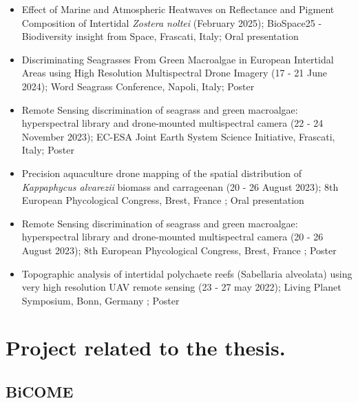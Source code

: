 \documentclass[
  letterpaper,
  11pt,
  english,
  singlespacing,
  headsepline]{MastersDoctoralThesis}
\begin{document}

\begin{itemize}
\item
  Effect of Marine and Atmospheric Heatwaves on Reflectance and Pigment
  Composition of Intertidal \emph{Zostera noltei} (February 2025);
  BioSpace25 - Biodiversity insight from Space, Frascati, Italy; Oral
  presentation
\item
  Discriminating Seagrasses From Green Macroalgae in European Intertidal
  Areas using High Resolution Multispectral Drone Imagery (17 - 21 June
  2024); Word Seagrass Conference, Napoli, Italy; Poster
\item
  Remote Sensing discrimination of seagrass and green macroalgae:
  hyperspectral library and drone-mounted multispectral camera (22 - 24
  November 2023); EC-ESA Joint Earth System Science Initiative,
  Frascati, Italy; Poster
\item
  Precision aquaculture drone mapping of the spatial distribution of
  \emph{Kappaphycus alvarezii} biomass and carrageenan (20 - 26 August
  2023); 8th European Phycological Congress, Brest, France ; Oral
  presentation
\item
  Remote Sensing discrimination of seagrass and green macroalgae:
  hyperspectral library and drone-mounted multispectral camera (20 - 26
  August 2023); 8th European Phycological Congress, Brest, France ;
  Poster
\item
  Topographic analysis of intertidal polychaete reefs (Sabellaria
  alveolata) using very high resolution UAV remote sensing (23 - 27 may
  2022); Living Planet Symposium, Bonn, Germany ; Poster
\end{itemize}

\section*{Project related to the
thesis.}\label{project-related-to-the-thesis.}


\subsection*{BiCOME}\label{bicome}
\end{document}
